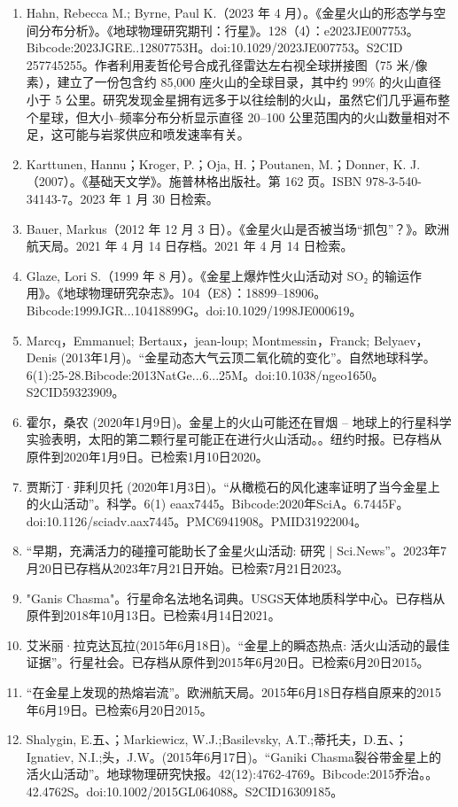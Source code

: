 \begin{enumerate}
\item Hahn, Rebecca M.; Byrne, Paul K.（2023 年 4 月）。《金星火山的形态学与空间分布分析》。《地球物理研究期刊：行星》。128（4）：e2023JE007753。Bibcode:2023JGRE..12807753H。doi:10.1029/2023JE007753。S2CID 257745255。作者利用麦哲伦号合成孔径雷达左右视全球拼接图（75 米/像素），建立了一份包含约 85,000 座火山的全球目录，其中约 99\% 的火山直径小于 5 公里。研究发现金星拥有远多于以往绘制的火山，虽然它们几乎遍布整个星球，但大小–频率分布分析显示直径 20–100 公里范围内的火山数量相对不足，这可能与岩浆供应和喷发速率有关。
\item Karttunen, Hannu；Kroger, P.；Oja, H.；Poutanen, M.；Donner, K. J.（2007）。《基础天文学》。施普林格出版社。第 162 页。ISBN 978-3-540-34143-7。2023 年 1 月 30 日检索。
\item Bauer, Markus（2012 年 12 月 3 日）。《金星火山是否被当场“抓包”？》。欧洲航天局。2021 年 4 月 14 日存档。2021 年 4 月 14 日检索。
\item Glaze, Lori S.（1999 年 8 月）。《金星上爆炸性火山活动对 SO₂ 的输运作用》。《地球物理研究杂志》。104（E8）：18899–18906。Bibcode:1999JGR...10418899G。doi:10.1029/1998JE000619。
\item Marcq，Emmanuel; Bertaux，jean-loup; Montmessin，Franck; Belyaev，Denis (2013年1月)。“金星动态大气云顶二氧化硫的变化”。自然地球科学。6(1):25-28.Bibcode:2013NatGe...6...25M。doi:10.1038/ngeo1650。S2CID59323909。 
\item 霍尔，桑农 (2020年1月9日)。金星上的火山可能还在冒烟 -- 地球上的行星科学实验表明，太阳的第二颗行星可能正在进行火山活动。。纽约时报。已存档从原件到2020年1月9日。已检索1月10日2020。
\item 贾斯汀·菲利贝托 (2020年1月3日)。“从橄榄石的风化速率证明了当今金星上的火山活动”。科学。6(1) eaax7445。Bibcode:2020年SciA。6.7445F。doi:10.1126/sciadv.aax7445。PMC6941908。PMID31922004。  
\item “早期，充满活力的碰撞可能助长了金星火山活动: 研究 | Sci.News”。2023年7月20日已存档从2023年7月21日开始。已检索7月21日2023。
\item "Ganis Chasma"。行星命名法地名词典。USGS天体地质科学中心。已存档从原件到2018年10月13日。已检索4月14日2021。
\item 艾米丽·拉克达瓦拉(2015年6月18日)。“金星上的瞬态热点: 活火山活动的最佳证据”。行星社会。已存档从原件到2015年6月20日。已检索6月20日2015。
\item “在金星上发现的热熔岩流”。欧洲航天局。2015年6月18日存档自原来的2015年6月19日。已检索6月20日2015。
\item Shalygin, E.五、；Markiewicz, W.J.;Basilevsky, A.T.;蒂托夫，D.五、；Ignatiev, N.I.;头，J.W。(2015年6月17日)。“Ganiki Chasma裂谷带金星上的活火山活动”。地球物理研究快报。42(12):4762-4769。Bibcode:2015乔治。。42.4762S。doi:10.1002/2015GL064088。S2CID16309185。 

\end{enumerate}
